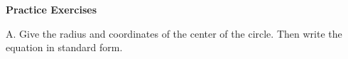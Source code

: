 \def\curdir{/storage/emulated/0/Documents/documents/latex/1920/Grade-10/3rd/equation-and-graph-of-a-circle/fa}

\textbf{Practice Exercises}

\vspce

A. Give the radius and coordinates of the center of the circle. Then write the equation in standard form. 
\begin{enumerate}[label = \arabic*. ]

\begin{multicols}{3}
\item 
\item 
\item 
\item 
\item 
\item 
\end{multicols} 
\end{enumerate}  
\vspace*{1ex}
